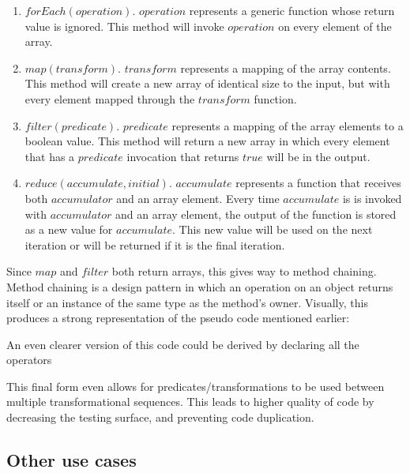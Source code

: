 \documentclass{article}
\begin{document}
  \begin{enumerate}
    \item $forEach(operation)$.  $operation$ represents a generic function whose return value is ignored.  This method will invoke $operation$ on every element of the array.

    \item $map(transform)$.  $transform$ represents a mapping of the array contents.  This method will create a new array of identical size to the input, but with every element mapped through the $transform$ function.

    \item $filter(predicate)$.  $predicate$ represents a mapping of the array elements to a boolean value.  This method will return a new array in which every element that has a $predicate$ invocation that returns $true$ will be in the output.

    \item $reduce(accumulate, initial)$.  $accumulate$ represents a function that receives both $accumulator$ and an array element. Every time $accumulate$ is is invoked with $accumulator$ and an array element, the output of the function is stored as a new value for $accumulate$.  This new value will be used on the next iteration or will be returned if it is the final iteration.

  \end{enumerate}

  Since $map$ and $filter$ both return arrays, this gives way to method chaining. Method chaining is a design pattern in which an operation on an object returns itself or an instance of the same type as the method's owner. Visually, this produces a strong representation of the pseudo code mentioned earlier:
  
   

  An even clearer version of this code could be derived by declaring all the operators

  

  This final form even allows for predicates/transformations to be used between multiple transformational sequences.  This leads to higher quality of code by decreasing the testing surface, and preventing code duplication. 

\subsection{Other use cases}
\end{document}
